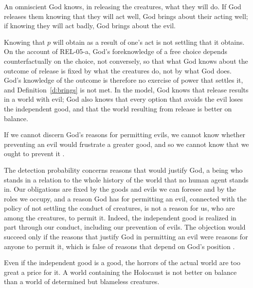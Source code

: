 \documentclass{situationist-preprint}
\begin{document}
\begin{objection}[Foreknowledge]
An omniscient God knows, in releasing the creatures, what they will do. If God releases them knowing that they will act well, God brings about their acting well; if knowing they will act badly, God brings about the evil.
\end{objection}

\begin{reply}
Knowing that $p$ will obtain as a result of one's act is not settling that it obtains. On the account of REL-05-a, God's foreknowledge of a free choice depends counterfactually on the choice, not conversely, so that what God knows about the outcome of release is fixed by what the creatures do, not by what God does. God's knowledge of the outcome is therefore no exercise of power that settles it, and Definition~\ref{d:brings} is not met. In the model, God knows that release results in a world with evil; God also knows that every option that avoids the evil loses the independent good, and that the world resulting from release is better on balance.
\end{reply}

\begin{objection}
If we cannot discern God's reasons for permitting evils, we cannot know whether preventing an evil would frustrate a greater good, and so we cannot know that we ought to prevent it \citep{AlmeidaOppy2003}.
\end{objection}

\begin{reply}
The detection probability concerns reasons that would justify God, a being who stands in a relation to the whole history of the world that no human agent stands in. Our obligations are fixed by the goods and evils we can foresee and by the roles we occupy, and a reason God has for permitting an evil, connected with the policy of not settling the conduct of creatures, is not a reason for us, who are among the creatures, to permit it. Indeed, the independent good is realized in part through our conduct, including our prevention of evils. The objection would succeed only if the reasons that justify God in permitting an evil were reasons for anyone to permit it, which is false of reasons that depend on God's position \citep{BergmannRea2005}.
\end{reply}

\begin{objection}
Even if the independent good is a good, the horrors of the actual world are too great a price for it. A world containing the Holocaust is not better on balance than a world of determined but blameless creatures.
\end{objection}
\end{document}
